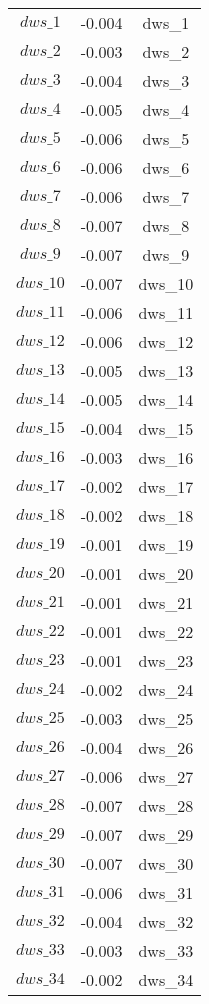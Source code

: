 \begin{center}
\begin{longtable}{ccc}
$dws\_1$ 	 & 	 -0.004 	 & 	 dws\_1\\
$dws\_2$ 	 & 	 -0.003 	 & 	 dws\_2\\
$dws\_3$ 	 & 	 -0.004 	 & 	 dws\_3\\
$dws\_4$ 	 & 	 -0.005 	 & 	 dws\_4\\
$dws\_5$ 	 & 	 -0.006 	 & 	 dws\_5\\
$dws\_6$ 	 & 	 -0.006 	 & 	 dws\_6\\
$dws\_7$ 	 & 	 -0.006 	 & 	 dws\_7\\
$dws\_8$ 	 & 	 -0.007 	 & 	 dws\_8\\
$dws\_9$ 	 & 	 -0.007 	 & 	 dws\_9\\
$dws\_10$ 	 & 	 -0.007 	 & 	 dws\_10\\
$dws\_11$ 	 & 	 -0.006 	 & 	 dws\_11\\
$dws\_12$ 	 & 	 -0.006 	 & 	 dws\_12\\
$dws\_13$ 	 & 	 -0.005 	 & 	 dws\_13\\
$dws\_14$ 	 & 	 -0.005 	 & 	 dws\_14\\
$dws\_15$ 	 & 	 -0.004 	 & 	 dws\_15\\
$dws\_16$ 	 & 	 -0.003 	 & 	 dws\_16\\
$dws\_17$ 	 & 	 -0.002 	 & 	 dws\_17\\
$dws\_18$ 	 & 	 -0.002 	 & 	 dws\_18\\
$dws\_19$ 	 & 	 -0.001 	 & 	 dws\_19\\
$dws\_20$ 	 & 	 -0.001 	 & 	 dws\_20\\
$dws\_21$ 	 & 	 -0.001 	 & 	 dws\_21\\
$dws\_22$ 	 & 	 -0.001 	 & 	 dws\_22\\
$dws\_23$ 	 & 	 -0.001 	 & 	 dws\_23\\
$dws\_24$ 	 & 	 -0.002 	 & 	 dws\_24\\
$dws\_25$ 	 & 	 -0.003 	 & 	 dws\_25\\
$dws\_26$ 	 & 	 -0.004 	 & 	 dws\_26\\
$dws\_27$ 	 & 	 -0.006 	 & 	 dws\_27\\
$dws\_28$ 	 & 	 -0.007 	 & 	 dws\_28\\
$dws\_29$ 	 & 	 -0.007 	 & 	 dws\_29\\
$dws\_30$ 	 & 	 -0.007 	 & 	 dws\_30\\
$dws\_31$ 	 & 	 -0.006 	 & 	 dws\_31\\
$dws\_32$ 	 & 	 -0.004 	 & 	 dws\_32\\
$dws\_33$ 	 & 	 -0.003 	 & 	 dws\_33\\
$dws\_34$ 	 & 	 -0.002 	 & 	 dws\_34\\

\end{longtable}
\end{center}
